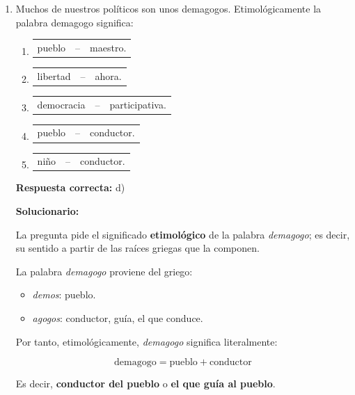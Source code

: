 \begin{enumerate}[resume]
	
	\item Muchos de nuestros políticos son unos demagogos. Etimológicamente la palabra demagogo significa:
	
	\begin{enumerate}[label=\alph*)]
		\item \begin{tabular}{p{2.5cm} cp{3cm}} pueblo & -- & maestro. \end{tabular}
		\item \begin{tabular}{p{2.5cm} cp{3cm}} libertad & -- & ahora. \end{tabular}
		\item \begin{tabular}{p{2.5cm} cp{3cm}} democracia & -- & participativa. \end{tabular}
		\item \begin{tabular}{p{2.5cm} cp{3cm}} pueblo & -- & conductor. \end{tabular}
		\item \begin{tabular}{p{2.5cm} cp{3cm}} niño & -- & conductor. \end{tabular}
	\end{enumerate}
	
	\textbf{Respuesta correcta:} d)
	
	\vspace{2mm}
	\textbf{Solucionario:}
	
	La pregunta pide el significado \textbf{etimológico} de la palabra \textit{demagogo}; es decir, su sentido a partir de las raíces griegas que la componen.
	
	La palabra \textit{demagogo} proviene del griego:
	
	\begin{itemize}[label=--]
		\item \textit{demos}: pueblo.
		\item \textit{agogos}: conductor, guía, el que conduce.
	\end{itemize}
	
	Por tanto, etimológicamente, \textit{demagogo} significa literalmente:
	
	\[
	\text{demagogo} = \text{pueblo} + \text{conductor}
	\]
	
	Es decir, \textbf{conductor del pueblo} o \textbf{el que guía al pueblo}.
	

\end{enumerate}
